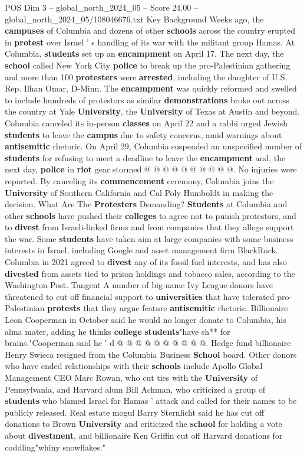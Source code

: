 \begin{textsample}{POS Dim 3 – global\_north\_2024\_05 – Score 24.00 – global\_north\_2024\_05/108046676.txt}
Key Background Weeks ago, the \textbf{campuses} of Columbia and dozens of other \textbf{schools} across the country erupted in \textbf{protest} over Israel ' s handling of its war with the militant group Hamas.
At Columbia, \textbf{students} set up an \textbf{encampment} on April 17.
The next day, the \textbf{school} called New York City \textbf{police} to break up the pro-Palestinian gathering and more than 100 \textbf{protesters} were \textbf{arrested}, including the daughter of U.S.
Rep.
Ilhan Omar, D-Minn.
The \textbf{encampment} was quickly reformed and swelled to include hundreds of protestors as similar \textbf{demonstrations} broke out across the country at Yale \textbf{University}, the \textbf{University} of Texas at Austin and beyond.
Columbia canceled its in-person \textbf{classes} on April 22 and a rabbi urged Jewish \textbf{students} to leave the \textbf{campus} due to safety concerns, amid warnings about \textbf{antisemitic} rhetoric.
On April 29, Columbia suspended an unspecified number of \textbf{students} for refusing to meet a deadline to leave the \textbf{encampment} and, the next day, \textbf{police} in \textbf{riot} gear stormed @ @ @ @ @ @ @ @ @ @.
No injuries were reported.
By canceling its \textbf{commencement} ceremony, Columbia joins the \textbf{University} of Southern California and Cal Poly Humboldt in making the decision.
What Are The \textbf{Protesters} Demanding? \textbf{Students} at Columbia and other \textbf{schools} have pushed their \textbf{colleges} to agree not to punish protestors, and to \textbf{divest} from Israeli-linked firms and from companies that they allege support the war.
Some \textbf{students} have taken aim at large companies with some business interests in Israel, including Google and asset management firm BlackRock.
Columbia in 2021 agreed to \textbf{divest} any of its fossil fuel interests, and has also \textbf{divested} from assets tied to prison holdings and tobacco sales, according to the Washington Post.
Tangent A number of big-name Ivy League donors have threatened to cut off financial support to \textbf{universities} that have tolerated pro-Palestinian \textbf{protests} that they argue feature \textbf{antisemitic} rhetoric.
Billionaire Leon Cooperman in October said he would no longer donate to Columbia, his alma mater, adding he thinks \textbf{college} \textbf{students}"have sh** for brains."Cooperman said he ' d @ @ @ @ @ @ @ @ @ @.
Hedge fund billionaire Henry Swieca resigned from the Columbia Business \textbf{School} board.
Other donors who have ended relationships with their \textbf{schools} include Apollo Global Management CEO Marc Rowan, who cut ties with the \textbf{University} of Pennsylvania, and Harvard alum Bill Ackman, who criticized a group of \textbf{students} who blamed Israel for Hamas ' attack and called for their names to be publicly released.
Real estate mogul Barry Sternlicht said he has cut off donations to Brown \textbf{University} and criticized the \textbf{school} for holding a vote about \textbf{divestment}, and billionaire Ken Griffin cut off Harvard donations for coddling"whiny snowflakes."


\end{textsample}
